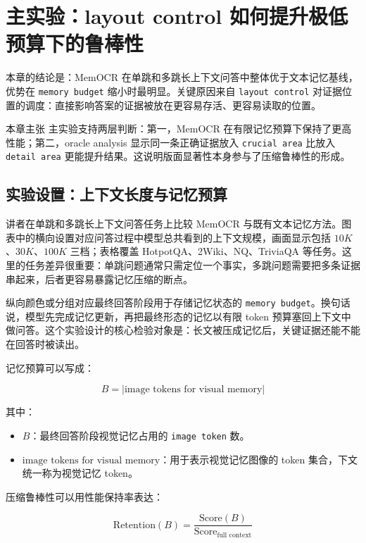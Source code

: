 \section{主实验：layout control 如何提升极低预算下的鲁棒性}

本章的结论是：MemOCR 在单跳和多跳长上下文问答中整体优于文本记忆基线，优势在 \texttt{memory budget} 缩小时最明显。关键原因来自 \texttt{layout control} 对证据位置的调度：直接影响答案的证据被放在更容易存活、更容易读取的位置。

\begin{importantbox}{本章主张}
主实验支持两层判断：第一，MemOCR 在有限记忆预算下保持了更高性能；第二，oracle analysis 显示同一条正确证据放入 \texttt{crucial area} 比放入 \texttt{detail area} 更能提升结果。这说明版面显著性本身参与了压缩鲁棒性的形成。
\end{importantbox}

\subsection{实验设置：上下文长度与记忆预算}

讲者在单跳和多跳长上下文问答任务上比较 MemOCR 与既有文本记忆方法。图表中的横向设置对应问答过程中模型总共看到的上下文规模，画面显示包括 $10K$、$30K$、$100K$ 三档；表格覆盖 HotpotQA、2Wiki、NQ、TriviaQA 等任务。这里的任务差异很重要：单跳问题通常只需定位一个事实，多跳问题需要把多条证据串起来，后者更容易暴露记忆压缩的断点。

纵向颜色或分组对应最终回答阶段用于存储记忆状态的 \texttt{memory budget}。换句话说，模型先完成记忆更新，再把最终形态的记忆以有限 token 预算塞回上下文中做问答。这个实验设计的核心检验对象是：长文被压成记忆后，关键证据还能不能在回答时被读出。

记忆预算可以写成：

$$
B = |\text{image tokens for visual memory}|
$$

其中：

\begin{itemize}
    \item $B$：最终回答阶段视觉记忆占用的 \texttt{image token} 数。
    \item $\text{image tokens for visual memory}$：用于表示视觉记忆图像的 token 集合，下文统一称为视觉记忆 token。
\end{itemize}

压缩鲁棒性可以用性能保持率表达：

$$
\text{Retention}(B) =
\frac{\text{Score}(B)}{\text{Score}_{\text{full context}}}
$$

